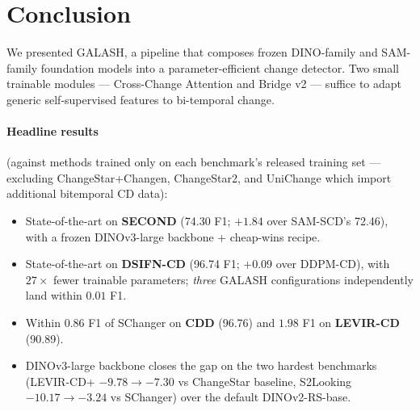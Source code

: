 \section{Conclusion}
\label{sec:conclusion}

We presented GALASH, a pipeline that composes frozen DINO-family and
SAM-family foundation models into a parameter-efficient change detector.
Two small trainable modules --- Cross-Change Attention and Bridge v2 ---
suffice to adapt generic self-supervised features to bi-temporal change.

\paragraph{Headline results} (against methods trained only on each
benchmark's released training set --- excluding ChangeStar+Changen,
ChangeStar2, and UniChange which import additional bitemporal CD data):
\begin{itemize}
  \item State-of-the-art on \textbf{SECOND} (74.30 F1; $+1.84$ over
    SAM-SCD's 72.46), with a frozen DINOv3-large backbone + cheap-wins recipe.
  \item State-of-the-art on \textbf{DSIFN-CD} (96.74 F1; $+0.09$ over
    DDPM-CD), with $27\times$ fewer trainable parameters; \emph{three}
    GALASH configurations independently land within $0.01$ F1.
  \item Within $0.86$ F1 of SChanger on \textbf{CDD} (96.76) and $1.98$ F1
    on \textbf{LEVIR-CD} (90.89).
  \item DINOv3-large backbone closes the gap on the two hardest benchmarks
    (LEVIR-CD+ $-9.78 \to -7.30$ vs ChangeStar baseline, S2Looking
    $-10.17 \to -3.24$ vs SChanger) over the default DINOv2-RS-base.
\end{itemize}

